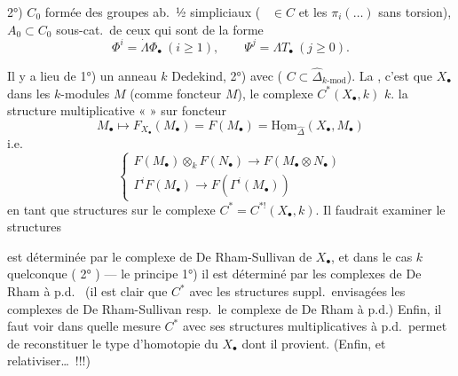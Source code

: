 \documentclass[11pt,a4paper]{article}
\begin{document}
2°) $C_0$ \struck{\ill{}} formée des groupes ab.\ ½
simpliciaux \struck{\ill{}}  (\ \struck{\ill{}} $\in C$ et les
$\pi_i(\ldots)$  sans torsion), $A_0 \subset C_0$ sous-cat.\ de ceux qui sont de la forme
\[
\Phi^{i} = \dot{\Lambda}\Phi_{\bullet} \ (i \geq 1), \qquad \Psi^{j} = \Lambda T_{\bullet} \ (j \geq 0).
\]

Il y a lieu de 
1°)  \ill{} \ill{} un anneau  $k$  Dedekind,
 2°) avec  \ill{} ( $C \subset \widehat{\Delta}_{k\text{-}\mathrm{mod}}$).
La    , c'est que 
   $X_{\bullet}$ dans les $k$-modules 
 \struck{\ill{}} $M$ (comme foncteur  $M$),  
le complexe  $C^{*}(X_{\bullet}, k)$  \ill{}
 $k$.     \ill{}
  la structure multiplicative \ill{} « \ill{} \ill{} » sur
 foncteur
\[
M_{\bullet} \longmapsto F_{X_\bullet}(M_\bullet) = F(M_\bullet) = \underline{\mathrm{Hom}}_{\widehat{\Delta}}(X_\bullet, M_\bullet)
\]
i.e.\ 
\[
\begin{cases}
F(M_\bullet) \otimes_{k} F(N_\bullet) \longrightarrow F(M_\bullet \otimes N_\bullet) \\
\Gamma^{i} F(M_\bullet) \longrightarrow F(\Gamma^{i}(M_\bullet))
\end{cases}
\]
en tant que \struck{\ill{}} structures  sur le complexe $C^{*} = C^{*!}(X_\bullet, k)$.
Il faudrait examiner   le  
\struck{\ill{}} structures 

est déterminée par le complexe de De Rham-Sullivan de $X_\bullet$, et dans le cas $k$ quelconque ( 2° ) — le principe   1°) il est déterminé par les complexes
de De Rham à p.d.\   (il est clair que $C^{*}$ avec les structures suppl.\
envisagées  \struck{\ill{}} les complexes de De Rham-Sullivan resp.\ le complexe de
De Rham à p.d.) Enfin, il faut voir dans quelle mesure $C^{*}$ avec ses structures multiplicatives à p.d.\
permet de reconstituer le type d'homotopie du $X_\bullet$ dont il provient. (Enfin, 
\uncertain{faisceautiser} et relativiser\ldots\ !!!)
\end{document}
